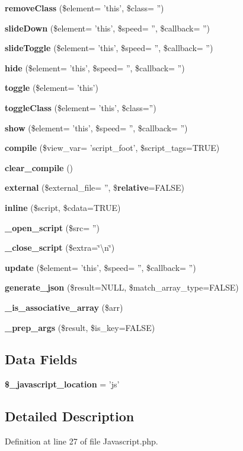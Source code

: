 \begin{DoxyCompactItemize}
\item 
{\bf remove\-Class} (\$element= 'this', \$class= '')
\item 
{\bf slide\-Down} (\$element= 'this', \$speed= '', \$callback= '')
\item 
{\bf slide\-Toggle} (\$element= 'this', \$speed= '', \$callback= '')
\item 
{\bf hide} (\$element= 'this', \$speed= '', \$callback= '')
\item 
{\bf toggle} (\$element= 'this')
\item 
{\bf toggle\-Class} (\$element= 'this', \$class='')
\item 
{\bf show} (\$element= 'this', \$speed= '', \$callback= '')
\item 
{\bf compile} (\$view\-\_\-var= 'script\-\_\-foot', \$script\-\_\-tags=T\-R\-U\-E)
\item 
{\bf clear\-\_\-compile} ()
\item 
{\bf external} (\$external\-\_\-file= '', \${\bf relative}=F\-A\-L\-S\-E)
\item 
{\bf inline} (\$script, \$cdata=T\-R\-U\-E)
\item 
{\bf \-\_\-open\-\_\-script} (\$src= '')
\item 
{\bf \-\_\-close\-\_\-script} (\$extra=\char`\"{}\textbackslash{}n\char`\"{})
\item 
{\bf update} (\$element= 'this', \$speed= '', \$callback= '')
\item 
{\bf generate\-\_\-json} (\$result=N\-U\-L\-L, \$match\-\_\-array\-\_\-type=F\-A\-L\-S\-E)
\item 
{\bf \-\_\-is\-\_\-associative\-\_\-array} (\$arr)
\item 
{\bf \-\_\-prep\-\_\-args} (\$result, \$is\-\_\-key=F\-A\-L\-S\-E)
\end{DoxyCompactItemize}
\subsection*{Data Fields}
\begin{DoxyCompactItemize}
\item 
{\bf \$\-\_\-javascript\-\_\-location} = 'js'
\end{DoxyCompactItemize}


\subsection{Detailed Description}


Definition at line 27 of file Javascript.\-php.




